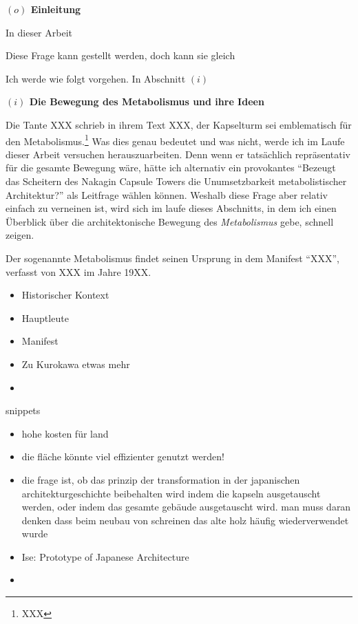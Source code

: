 \documentclass[a4paper, 12pt]{article}
\begin{document}
\begin{onehalfspace} 

\noindent\textbf{$(o)$ Einleitung}

\noindent In dieser Arbeit 



Diese Frage kann gestellt werden, doch kann sie gleich 

\vspace{3mm}

Ich werde wie folgt vorgehen. In Abschnitt $(i)$ 

\vspace{5mm}
\noindent\textbf{$(i)$ Die Bewegung des Metabolismus und ihre Ideen} %

Die Tante XXX schrieb in ihrem Text XXX, der Kapselturm sei emblematisch für den Metabolismus.\footnote{XXX} Was dies genau bedeutet und was nicht, werde ich im Laufe dieser Arbeit versuchen herauszuarbeiten. Denn wenn er tatsächlich repräsentativ für die gesamte Bewegung wäre, hätte ich alternativ ein provokantes "`Bezeugt das Scheitern des Nakagin Capsule Towers die Unumsetzbarkeit metabolistischer Architektur?"' als Leitfrage wählen können. Weshalb diese Frage aber relativ einfach zu verneinen ist, wird sich im laufe dieses Abschnitts, in dem ich einen Überblick über die architektonische Bewegung des \emph{Metabolismus} gebe, schnell zeigen.

Der sogenannte Metabolismus findet seinen Ursprung in dem Manifest "`XXX"', verfasst von XXX im Jahre 19XX. 
\begin{itemize}
  \item Historischer Kontext
  \item Hauptleute
  \item Manifest
  \item Zu Kurokawa etwas mehr
  \item  
\end{itemize}

snippets

\begin{itemize}
  \item hohe kosten für land
  \item die fläche könnte viel effizienter genutzt werden!
  \item die frage ist, ob das prinzip der transformation in der japanischen architekturgeschichte beibehalten wird indem die kapseln ausgetauscht werden, oder indem das gesamte gebäude ausgetauscht wird. man muss daran denken dass beim neubau von schreinen das alte holz häufig wiederverwendet wurde
  \item Ise: Prototype of Japanese Architecture
  \item 
\end{itemize}



\end{onehalfspace}
\end{document}
